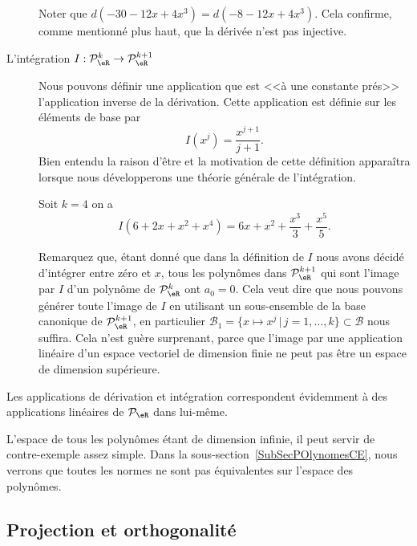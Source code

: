 \begin{description}
\begin{example}
    Noter que $d(-30-12x+4x^3)=d(-8-12x+4x^3)$. Cela confirme, comme mentionné plus haut, que la dérivée n'est pas injective.
\end{example}
      \item[L'intégration $I: \mathcal{P}_\eR^k \to \mathcal{P}_\eR^{k+1}$] Nous pouvons définir une application que est <<à une constante prés>> l'application inverse de la dérivation. Cette application est définie sur les éléments de base par
          \begin{equation}
                I(x^j)= \frac{x^{j+1}}{j+1}.
          \end{equation}
          Bien entendu la raison d'être et la motivation de cette définition apparaîtra lorsque nous développerons une théorie générale de l'intégration.

\begin{example}
   Soit $k=4$ on a
  \begin{equation}
    I(6+2x+x^2+x^4)= 6x+x^2+\frac{x^3}{3}+\frac{x^5}{5}.
    \end{equation}
\end{example}

Remarquez que, étant donné que dans la définition de $I$ nous avons décidé d'intégrer entre zéro et $x$, tous les polynômes dans $\mathcal{P}_\eR^{k+1}$ qui sont l'image par $I$ d'un polynôme de $\mathcal{P}_\eR^{k}$ ont $a_0=0$. Cela veut dire que nous pouvons générer toute l'image de $I$ en utilisant un sous-ensemble de la base canonique de $\mathcal{P}_\eR^{k+1}$,  en particulier $\mathcal{B}_1=\{x\mapsto x^j \,|\, j=1, \ldots, k\}\subset \mathcal{B}$ nous suffira. Cela n'est guère surprenant, parce que l'image par une application linéaire d'un espace vectoriel de dimension finie ne peut pas être un espace de dimension supérieure.
\end{description}

Les applications de dérivation et intégration correspondent évidemment à des applications linéaires de $\mathcal{P}_\eR$ dans lui-même.

L'espace de tous les polynômes étant de dimension infinie, il peut servir de contre-exemple assez simple. Dans la sous-section~\ref{SubSecPOlynomesCE}, nous verrons que toutes les normes ne sont pas équivalentes sur l'espace des polynômes.

\subsection{Projection et orthogonalité}

